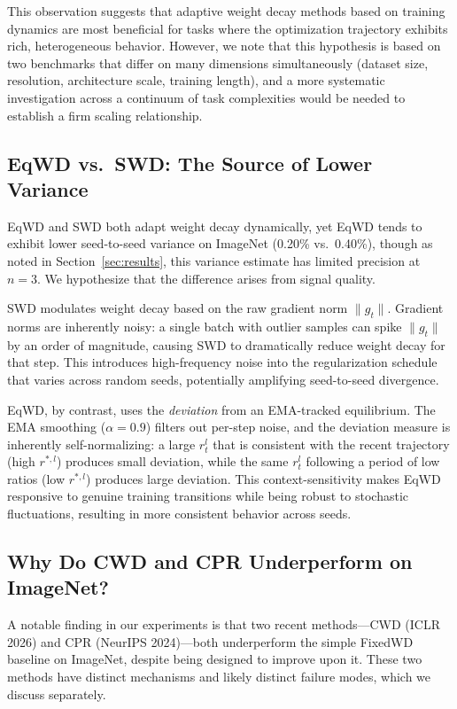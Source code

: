 \documentclass{article}
\begin{document}
This observation suggests that adaptive weight decay methods based on
training dynamics are most beneficial for tasks where the optimization
trajectory exhibits rich, heterogeneous behavior. However, we note that
this hypothesis is based on two benchmarks that differ on many
dimensions simultaneously (dataset size, resolution, architecture scale,
training length), and a more systematic investigation across a continuum
of task complexities would be needed to establish a firm scaling
relationship.

\subsection{EqWD vs.\ SWD: The Source of Lower Variance}
\label{sec:variance}

EqWD and SWD both adapt weight decay dynamically, yet EqWD tends to
exhibit lower seed-to-seed variance on ImageNet (0.20\% vs.~0.40\%),
though as noted in Section~\ref{sec:results}, this variance estimate has limited
precision at $n = 3$. We hypothesize that the difference arises from
signal quality.

SWD modulates weight decay based on the raw gradient norm $\|g_t\|$.
Gradient norms are inherently noisy: a single batch with outlier samples
can spike $\|g_t\|$ by an order of magnitude, causing SWD to
dramatically reduce weight decay for that step. This introduces
high-frequency noise into the regularization schedule that varies across
random seeds, potentially amplifying seed-to-seed divergence.

EqWD, by contrast, uses the \emph{deviation} from an EMA-tracked
equilibrium. The EMA smoothing ($\alpha = 0.9$) filters out per-step
noise, and the deviation measure is inherently self-normalizing: a large
$r_t^l$ that is consistent with the recent trajectory (high
$r^{*,l}$) produces small deviation, while the same $r_t^l$
following a period of low ratios (low $r^{*,l}$) produces large
deviation. This context-sensitivity makes EqWD responsive to genuine
training transitions while being robust to stochastic fluctuations,
resulting in more consistent behavior across seeds.

\subsection{Why Do CWD and CPR Underperform on ImageNet?}
\label{sec:cwd_cpr}

A notable finding in our experiments is that two recent methods---CWD
(ICLR 2026) and CPR (NeurIPS 2024)---both underperform the simple
FixedWD baseline on ImageNet, despite being designed to improve upon it.
These two methods have distinct mechanisms and likely distinct failure
modes, which we discuss separately.
\end{document}
